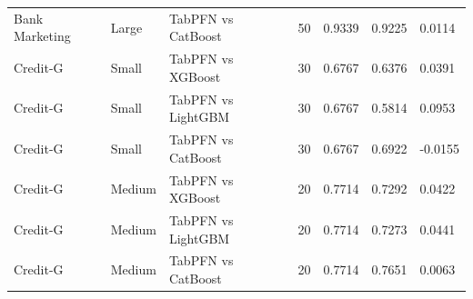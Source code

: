 \begin{longtable}{p{2.35cm}p{1.9cm}p{3.3cm}R{0.55cm}R{1.25cm}R{1.15cm}R{1.15cm}}
Bank Marketing & Large & TabPFN vs CatBoost & 50 & 0.9339 & 0.9225 & 0.0114 \\
Credit-G & Small & TabPFN vs XGBoost & 30 & 0.6767 & 0.6376 & 0.0391 \\
Credit-G & Small & TabPFN vs LightGBM & 30 & 0.6767 & 0.5814 & 0.0953 \\
Credit-G & Small & TabPFN vs CatBoost & 30 & 0.6767 & 0.6922 & -0.0155 \\
Credit-G & Medium & TabPFN vs XGBoost & 20 & 0.7714 & 0.7292 & 0.0422 \\
Credit-G & Medium & TabPFN vs LightGBM & 20 & 0.7714 & 0.7273 & 0.0441 \\
Credit-G & Medium & TabPFN vs CatBoost & 20 & 0.7714 & 0.7651 & 0.0063 \\
\bottomrule
\end{longtable}
\endgroup
